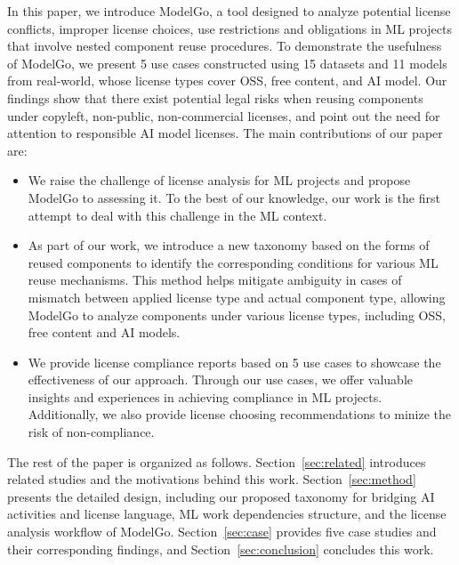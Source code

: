 In this paper, we introduce ModelGo, a tool designed to analyze potential license conflicts, improper license choices, use restrictions and obligations in ML projects that involve nested component reuse procedures.
To demonstrate the usefulness of ModelGo, we present 5 use cases constructed using 15 datasets and 11 models from real-world, whose license types cover OSS, free content, and AI model.
Our findings show that there exist potential legal risks when reusing  components under copyleft, non-public, non-commercial licenses, and point out the need for attention to responsible AI model licenses.
The main contributions of our paper are:
\begin{itemize}
    \item We raise the challenge of license analysis for ML projects and propose ModelGo to assessing it. To the best of our knowledge, our work is the first attempt to deal with this challenge in the ML context.
    \item As part of our work, we introduce a new taxonomy based on the forms of reused components to identify the corresponding conditions for various ML reuse mechanisms. This method helps mitigate ambiguity in cases of mismatch between applied license type and actual component type, allowing ModelGo to analyze components under various license types, including OSS, free content and AI models.
    \item  We provide license compliance reports based on 5 use cases to showcase the effectiveness of our approach. 
    Through our use cases, we offer valuable insights and experiences in achieving compliance in ML projects. 
    Additionally, we also provide license choosing recommendations to minize the risk of non-compliance.
\end{itemize}

The rest of the paper is organized as follows.
Section~\ref{sec:related} introduces related studies and the motivations behind this work.
Section~\ref{sec:method} presents the detailed design, including our proposed taxonomy for bridging AI activities and license language, ML work dependencies structure, and the license analysis workflow of ModelGo.
Section~\ref{sec:case} provides five case studies and their corresponding findings, and Section~\ref{sec:conclusion} concludes this work.


